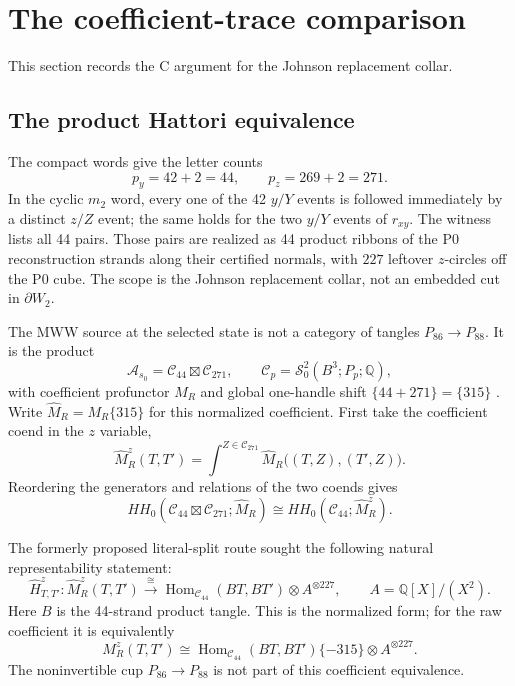 \documentclass[11pt]{amsart}
\theoremstyle{definition}
\theoremstyle{remark}
\newcommand{\Q}{\mathbb{Q}}
\begin{document}
\section{The coefficient-trace comparison}\label{sec:c-comparison}

This section records the C argument for the Johnson replacement collar.

\subsection{The product Hattori equivalence}

The compact words give the letter counts
\[
p_y=42+2=44,\qquad p_z=269+2=271.
\]
In the cyclic $m_2$ word, every one of the 42
$y/Y$ events is followed immediately by a distinct $z/Z$ event; the same
holds for the two $y/Y$ events of $r_{xy}$.  The witness lists all 44 pairs.
Those pairs are realized as 44 product ribbons of the P0 reconstruction
strands along their certified normals, with $227$ leftover $z$-circles off
the P0 cube.  The scope is the Johnson replacement collar, not an embedded
cut in $\partial W_2$.

The MWW source at the selected state is not a category of tangles
$P_{86}\to P_{88}$.  It is the product
\[
\mathcal A_{s_0}=\mathcal C_{44}\boxtimes\mathcal C_{271},\qquad
\mathcal C_p=\mathcal S^2_0(B^3;P_p;\Q),
\]
with coefficient profunctor $M_R$ and global one-handle shift
$\{44+271\}=\{315\}$ \cite[Theorem~4.7]{ManolescuWalkerWedrich2023}.
Write $\widehat M_R=M_R\{315\}$ for this normalized coefficient.  First take
the coefficient coend in the $z$ variable,
\begin{equation}\label{eq:zcoend}
\widehat M_R^z(T,T')=
\int^{Z\in\mathcal C_{271}}
\widehat M_R\bigl((T,Z),(T',Z)\bigr).
\end{equation}
Reordering the generators and relations of the two coends gives
\[
HH_0(\mathcal C_{44}\boxtimes\mathcal C_{271};\widehat M_R)
\cong HH_0(\mathcal C_{44};\widehat M_R^z).
\]

The formerly proposed literal-split route sought the following natural
representability statement:
\begin{equation}\label{eq:HattoriSplit}
\widehat H^z_{T,T'}:\widehat M_R^z(T,T')\xrightarrow{\cong}
\operatorname{Hom}_{\mathcal C_{44}}(BT,BT')
\otimes A^{\otimes227},
\qquad A=\Q[X]/(X^2).
\end{equation}
Here $B$ is the 44-strand product tangle.  This is the normalized form; for
the raw coefficient it is equivalently
\[
M_R^z(T,T')\cong
\operatorname{Hom}_{\mathcal C_{44}}(BT,BT')\{-315\}
\otimes A^{\otimes227}.
\]
The noninvertible cup $P_{86}\to P_{88}$ is not part of this coefficient
equivalence.
\end{document}
